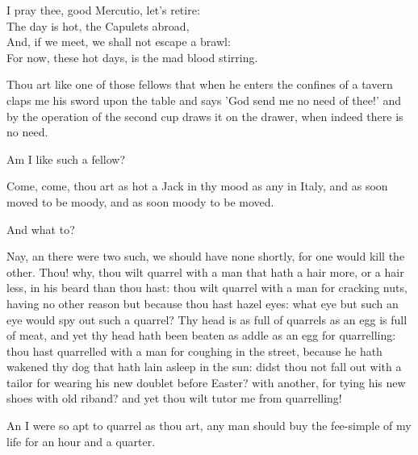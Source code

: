  
\begin{speech}
I pray thee, good Mercutio, let's retire: \\
The day is hot, the Capulets abroad, \\
And, if we meet, we shall not escape a brawl: \\
For now, these hot days, is the mad blood stirring. \\
\end{speech}
\begin{speech}
Thou art like one of those fellows
that when he enters the confines of a tavern
claps me his sword upon the table and says
'God send me no need of thee!' and by the
operation of the second cup draws it on the
drawer, when indeed there is no need.
\end{speech}
\begin{speech}
Am I like such a fellow?
\end{speech}
\begin{speech}
Come, come, thou art as hot a Jack
in thy mood as any in Italy, and as soon
moved to be moody, and as soon moody to
be moved.
\end{speech}
\begin{speech}
And what to?
\end{speech}
\begin{speech}
Nay, an there were two such, we
should have none shortly, for one would kill
the other. Thou! why, thou wilt quarrel with
a man that hath a hair more, or a hair less, in
his beard than thou hast: thou wilt quarrel
with a man for cracking nuts, having no other
reason but because thou hast hazel eyes: what
eye but such an eye would spy out such a
quarrel?   Thy head is as full of quarrels as
an egg is full of meat, and yet thy head hath
been beaten as addle as an egg for quarrelling:
thou hast quarrelled with a man for coughing
in the street, because he hath wakened thy dog
that hath lain asleep in the sun: didst thou
not fall out with a tailor for wearing his new
doublet before Easter? with another, for tying
his new shoes with old riband? and yet
thou wilt tutor me from quarrelling!
\end{speech}
\begin{speech}
An I were so apt to quarrel as thou
art, any man should buy the fee-simple of my
life for an hour and a quarter.
\end{speech}
